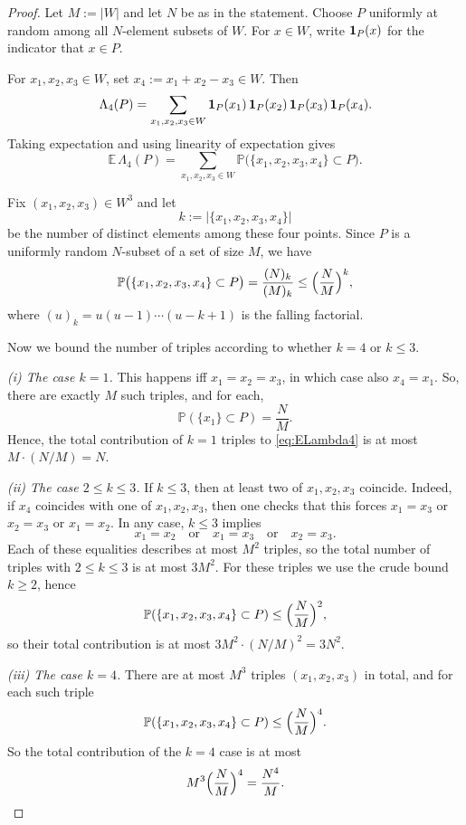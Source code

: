\documentclass{article}
\begin{document}
\begin{proof}
Let $M:=|W|$ and let $N$ be as in the statement. 
Choose $P$ uniformly at random among all $N$-element subsets of $W$.
For $x\in W$, write ${\bf 1}_P(x)$ for the indicator that $x\in P$.

For $x_1,x_2,x_3\in W$, set $x_4:=x_1+x_2-x_3\in W$. Then
\begin{equation}\label{eq:Lambda4-expand}
\Lambda_4(P)
=\sum_{x_1,x_2,x_3\in W}
{\bf 1}_P(x_1)\,{\bf 1}_P(x_2)\,{\bf 1}_P(x_3)\,{\bf 1}_P(x_4).
\end{equation}
Taking expectation and using linearity of expectation gives
\begin{equation}\label{eq:ELambda4}
\mathbb{E}\,\Lambda_4(P)
=\sum_{x_1,x_2,x_3\in W}
\mathbb{P}\bigl(\{x_1,x_2,x_3,x_4\}\subset P\bigr).
\end{equation}

Fix $(x_1,x_2,x_3)\in W^3$ and let 
\[
k:=\bigl|\{x_1,x_2,x_3,x_4\}\bigr|
\]
be the number of distinct elements among these four points. 
Since $P$ is a uniformly random $N$-subset of a set of size $M$, we have
\[
\mathbb{P}\bigl(\{x_1,x_2,x_3,x_4\}\subset P\bigr)
=\frac{(N)_k}{(M)_k}
\le \Bigl(\frac{N}{M}\Bigr)^k,
\]
where $(u)_k=u(u-1)\cdots(u-k+1)$ is the falling factorial.

Now we bound the number of triples according to whether $k=4$ or $k\le 3$.

\smallskip
\noindent
\emph{(i) The case $k=1$.}
This happens iff $x_1=x_2=x_3$, in which case also $x_4=x_1$. 
So, there are exactly $M$ such triples, and for each,
\[
\mathbb{P}(\{x_1\}\subset P)=\frac{N}{M}.
\]
Hence, the total contribution of $k=1$ triples to \eqref{eq:ELambda4} is at most $M\cdot (N/M)=N$.

\smallskip
\noindent
\emph{(ii) The case $2\le k\le 3$.}
If $k\le 3$, then at least two of $x_1,x_2,x_3$ coincide.
Indeed, if $x_4$ coincides with one of $x_1,x_2,x_3$, then one checks that this forces
$x_1=x_3$ or $x_2=x_3$ or $x_1=x_2$.
In any case, $k\le 3$ implies
\[
x_1=x_2 \quad\text{or}\quad x_1=x_3 \quad\text{or}\quad x_2=x_3.
\]
Each of these equalities describes at most $M^2$ triples, so the total number of triples with $2\le k\le 3$
is at most $3M^2$. For these triples we use the crude bound $k\ge 2$, hence
\[
\mathbb{P}(\{x_1,x_2,x_3,x_4\}\subset P)\le \Bigl(\frac{N}{M}\Bigr)^2,
\]
so their total contribution is at most $3M^2\cdot (N/M)^2=3N^2$.

\smallskip
\noindent
\emph{(iii) The case $k=4$.}
There are at most $M^3$ triples $(x_1,x_2,x_3)$ in total, and for each such triple
\[
\mathbb{P}(\{x_1,x_2,x_3,x_4\}\subset P)\le \Bigl(\frac{N}{M}\Bigr)^4.
\]
So the total contribution of the $k=4$ case is at most
\[
M^3\Bigl(\frac{N}{M}\Bigr)^4=\frac{N^4}{M}.
\]


\end{proof}
\end{document}

